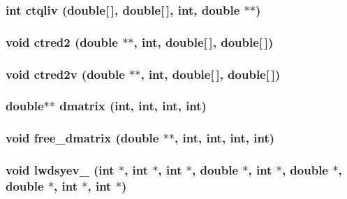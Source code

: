 \subsubsection{\setlength{\rightskip}{0pt plus 5cm}int ctqliv (double[$\,$], double[$\,$], int, double $\ast$$\ast$)}\label{ceigsys_8c_2e8004270e30c0fed0efa7905be17664}


\subsubsection{\setlength{\rightskip}{0pt plus 5cm}void ctred2 (double $\ast$$\ast$, int, double[$\,$], double[$\,$])}\label{ceigsys_8c_305081d51e6be3754d262d1093054771}


\subsubsection{\setlength{\rightskip}{0pt plus 5cm}void ctred2v (double $\ast$$\ast$, int, double[$\,$], double[$\,$])}\label{ceigsys_8c_9ce03419a361490ba5299072a2a0af26}


\subsubsection{\setlength{\rightskip}{0pt plus 5cm}double$\ast$$\ast$ dmatrix (int, int, int, int)}\label{ceigsys_8c_1ccaf1ced1551855c51abb0c1f29a2bb}


\subsubsection{\setlength{\rightskip}{0pt plus 5cm}void free\_\-dmatrix (double $\ast$$\ast$, int, int, int, int)}\label{ceigsys_8c_1d859f3330b0ef10f3425c3748dc03aa}


\subsubsection{\setlength{\rightskip}{0pt plus 5cm}void lwdsyev\_\- (int $\ast$, int $\ast$, int $\ast$, double $\ast$, int $\ast$, double $\ast$, double $\ast$, int $\ast$, int $\ast$)}\label{ceigsys_8c_08b0905bd36b1345637b44c9e39d4aba}


